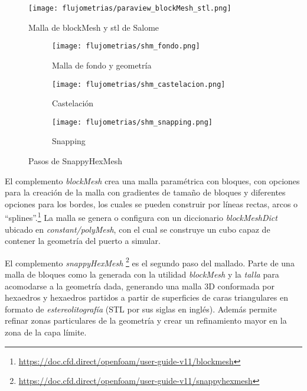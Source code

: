 \begin{figure}
    \centering
    \texttt{[image: flujometrias/paraview\_blockMesh\_stl.png]}
    \caption{Malla de blockMesh y stl de Salome}\label{fig:paraview_blockMesh_stl}
\end{figure}

\begin{figure}[t!]
    \centering
    \begin{subfigure}[t]{0.5\textwidth}
        \centering
        \texttt{[image: flujometrias/shm\_fondo.png]}
        \caption{Malla de fondo y geometría}
    \end{subfigure}%
    \begin{subfigure}[t]{0.5\textwidth}
        \centering
        \texttt{[image: flujometrias/shm\_castelacion.png]}
        \caption{Castelación}
    \end{subfigure}
    \begin{subfigure}[t]{0.5\textwidth}
        \centering
        \texttt{[image: flujometrias/shm\_snapping.png]}
        \caption{Snapping}
    \end{subfigure}
    \caption{Pasos de SnappyHexMesh\parencite{shm_steps}}\label{fig:openfoam_shm_pasos}
\end{figure}

El complemento \emph{blockMesh} crea una malla paramétrica con bloques, con
opciones para la creación de la malla con gradientes de tamaño de bloques y
diferentes opciones para los bordes, los cuales se pueden construir por líneas
rectas, arcos o
``splines''.\footnote{\url{https://doc.cfd.direct/openfoam/user-guide-v11/blockmesh}}
%
La malla se genera o configura con un diccionario \emph{blockMeshDict} ubicado
en \emph{constant/polyMesh}, con el cual se construye un cubo capaz de contener
la geometría del puerto a simular.

El complemento \emph{snappyHexMesh}
\footnote{\url{https://doc.cfd.direct/openfoam/user-guide-v11/snappyhexmesh}} es
el segundo paso del mallado.
%
Parte de una malla de bloques como la generada con la utilidad \emph{blockMesh}
y la \emph{talla} para acomodarse a la geometría dada, generando una malla 3D
conformada por hexaedros y hexaedros partidos a partir de superficies de caras
triangulares en formato de \emph{estereolitografía} (STL por sus siglas en
inglés).
%
Además permite refinar zonas particulares de la geometría y crear un
refinamiento mayor en la zona de la capa límite.

